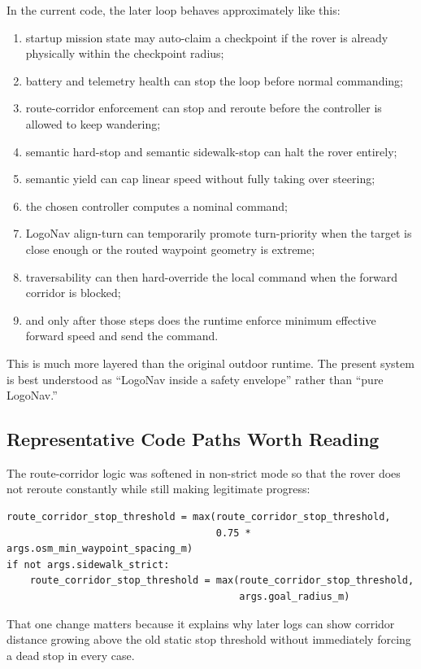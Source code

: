 \documentclass[11pt]{article}
\begin{document}
In the current code, the later loop behaves approximately like this:
\begin{enumerate}[leftmargin=*]
\item startup mission state may auto-claim a checkpoint if the rover is already physically within the checkpoint radius;
\item battery and telemetry health can stop the loop before normal commanding;
\item route-corridor enforcement can stop and reroute before the controller is allowed to keep wandering;
\item semantic hard-stop and semantic sidewalk-stop can halt the rover entirely;
\item semantic yield can cap linear speed without fully taking over steering;
\item the chosen controller computes a nominal command;
\item LogoNav align-turn can temporarily promote turn-priority when the target is close enough or the routed waypoint geometry is extreme;
\item traversability can then hard-override the local command when the forward corridor is blocked;
\item and only after those steps does the runtime enforce minimum effective forward speed and send the command.
\end{enumerate}

This is much more layered than the original outdoor runtime. The present system is best understood as ``LogoNav inside a safety envelope'' rather than ``pure LogoNav.''

\subsection*{Representative Code Paths Worth Reading}
The route-corridor logic was softened in non-strict mode so that the rover does not reroute constantly while still making legitimate progress:
\begin{verbatim}
route_corridor_stop_threshold = max(route_corridor_stop_threshold,
                                    0.75 * args.osm_min_waypoint_spacing_m)
if not args.sidewalk_strict:
    route_corridor_stop_threshold = max(route_corridor_stop_threshold,
                                        args.goal_radius_m)
\end{verbatim}

That one change matters because it explains why later logs can show corridor distance growing above the old static stop threshold without immediately forcing a dead stop in every case.
\end{document}
